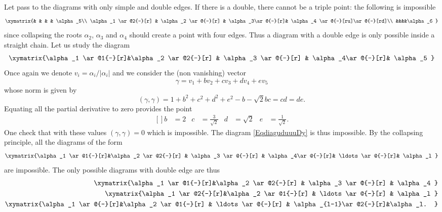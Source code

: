 Let pass to the diagrams with only simple and double edges. If there is a double, there cannot be a triple point: the following is impossible
\begin{equation}
    \xymatrix{%
         &                          &           &               &       \alpha_5\\
        \alpha_1 \ar@2{-}[r]   &    \alpha_2 \ar@{-}[r] & \alpha_3\ar@{-}[r]&  \alpha_4 \ar@{-}[ru]\ar@{-}[rd]\\
        &&&&\alpha_6
       }
\end{equation}
since collapsing the roots \( \alpha_2\), \( \alpha_3\) and \( \alpha_4\) should create a point with four edges. Thus a diagram with a double edge is only possible inside a straight chain. Let us study the diagram
\begin{equation}        \label{EqdiaguduuuDy}
    \xymatrix{%
    \alpha_1 \ar@1{-}[r]&\alpha_2  \ar@2{-}[r]   &    \alpha_3 \ar@{-}[r] & \alpha_4\ar@{-}[r]&  \alpha_5
       }
\end{equation}
Once again we denote \( v_i=\alpha_i/| \alpha_i |\) and we consider the (non vanishing) vector
\begin{equation}
    \gamma=v_1+bv_2+cv_3+dv_4+ev_5
\end{equation}
whose norm is given by
\begin{equation}
    (\gamma,\gamma)=1+b^2+c^2+d^2+e^2-b-\sqrt{2}bc=cd=de.
\end{equation}
Equating all the partial derivative to zero provides the point
\begin{equation}
    \begin{aligned}[]
        b&=2&c&=\frac{ 3 }{ \sqrt{2} }&d&=\sqrt{2}&e&=\frac{1}{ \sqrt{2} }.
    \end{aligned}
\end{equation}
One check that with these values \( (\gamma,\gamma)=0\) which is impossible. The diagram \eqref{EqdiaguduuuDy} is thus impossible. By the collapsing principle, all the diagrams of the form
\begin{equation}
    \xymatrix{%
    \alpha_1 \ar@1{-}[r]&\alpha_2  \ar@2{-}[r]   &    \alpha_3 \ar@{-}[r] & \alpha_4\ar@{-}[r]& \ldots \ar@{-}[r]&  \alpha_l
       }
\end{equation}
are impossible. The only possible diagrams with double edge are thus
\begin{subequations}
    \begin{align}
    \xymatrix{%
    \alpha_1 \ar@1{-}[r]&\alpha_2  \ar@2{-}[r]   &    \alpha_3 \ar@{-}[r] & \alpha_4
       }\\
    \xymatrix{%
    \alpha_1 \ar@2{-}[r]&\alpha_2  \ar@1{-}[r]   & \ldots \ar@{-}[r] & \alpha_l
    }    \label{subEqDynkdspds}\\
    \xymatrix{%
    \alpha_1 \ar@{-}[r]&\alpha_2  \ar@1{-}[r]   & \ldots \ar@{-}[r] & \alpha_{l-1}\ar@2{-}[r]&\alpha_l.
    }    \label{subEqdunksspd}
    \end{align}
\end{subequations}
